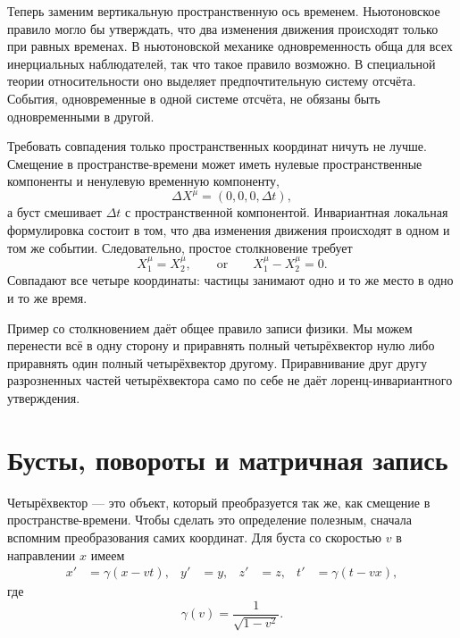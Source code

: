 Теперь заменим вертикальную пространственную ось временем. Ньютоновское правило могло бы утверждать, что два изменения движения происходят только при равных временах. В ньютоновской механике одновременность обща для всех инерциальных наблюдателей, так что такое правило возможно. В специальной теории относительности оно выделяет предпочтительную систему отсчёта. События, одновременные в одной системе отсчёта, не обязаны быть одновременными в другой.

Требовать совпадения только пространственных координат ничуть не лучше. Смещение в пространстве-времени может иметь нулевые пространственные компоненты и ненулевую временную компоненту,
\begin{equation}
  \Delta X^\mu=(0,0,0,\Delta t),
\end{equation}
а буст смешивает \(\Delta t\) с пространственной компонентой. Инвариантная локальная формулировка состоит в том, что два изменения движения происходят в одном и том же событии. Следовательно, простое столкновение требует
\begin{equation}
  X_1^\mu=X_2^\mu,
  \qquad\text{or}\qquad
  X_1^\mu-X_2^\mu=0.
\end{equation}
Совпадают все четыре координаты: частицы занимают одно и то же место в одно и то же время.

Пример со столкновением даёт общее правило записи физики. Мы можем перенести всё в одну сторону и приравнять полный четырёхвектор нулю либо приравнять один полный четырёхвектор другому. Приравнивание друг другу разрозненных частей четырёхвектора само по себе не даёт лоренц-инвариантного утверждения.

\section{Бусты, повороты и матричная запись}

Четырёхвектор — это объект, который преобразуется так же, как смещение в пространстве-времени. Чтобы сделать это определение полезным, сначала вспомним преобразования самих координат. Для буста со скоростью \(v\) в направлении \(x\) имеем
\begin{align}
  x'&=\gamma(x-vt), & y'&=y, & z'&=z,
  & t'&=\gamma(t-vx),                                      \label{eq:l6-boost}
\end{align}
где
\begin{equation}
  \gamma(v)=\frac{1}{\sqrt{1-v^2}}.
\end{equation}

\begin{classroomqa}
\end{classroomqa}

